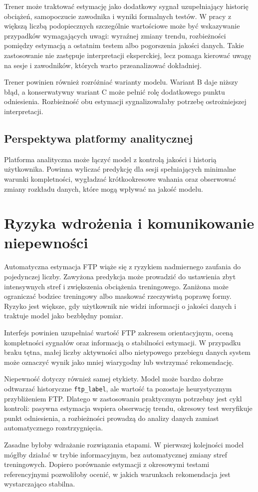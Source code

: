 Trener może traktować estymację jako dodatkowy sygnał uzupełniający historię obciążeń, samopoczucie zawodnika i wyniki formalnych testów. W pracy z większą liczbą podopiecznych szczególnie wartościowe może być wskazywanie przypadków wymagających uwagi: wyraźnej zmiany trendu, rozbieżności pomiędzy estymacją a ostatnim testem albo pogorszenia jakości danych. Takie zastosowanie nie zastępuje interpretacji eksperckiej, lecz pomaga kierować uwagę na sesje i zawodników, których warto przeanalizować dokładniej.

Trener powinien również rozróżniać warianty modelu. Wariant B daje niższy błąd, a konserwatywny wariant C może pełnić rolę dodatkowego punktu odniesienia. Rozbieżność obu estymacji sygnalizowałaby potrzebę ostrożniejszej interpretacji.

\subsection{Perspektywa platformy analitycznej}

Platforma analityczna może łączyć model z kontrolą jakości i historią użytkownika. Powinna wyliczać predykcję dla sesji spełniających minimalne warunki kompletności, wygładzać krótkookresowe wahania oraz obserwować zmiany rozkładu danych, które mogą wpływać na jakość modelu.

\section{Ryzyka wdrożenia i komunikowanie niepewności}

Automatyczna estymacja FTP wiąże się z ryzykiem nadmiernego zaufania do pojedynczej liczby. Zawyżona predykcja może prowadzić do ustawienia zbyt intensywnych stref i zwiększenia obciążenia treningowego. Zaniżona może ograniczać bodziec treningowy albo maskować rzeczywistą poprawę formy. Ryzyko jest większe, gdy użytkownik nie widzi informacji o jakości danych i traktuje model jako bezbłędny pomiar.

Interfejs powinien uzupełniać wartość FTP zakresem orientacyjnym, oceną kompletności sygnałów oraz informacją o stabilności estymacji. W przypadku braku tętna, małej liczby aktywności albo nietypowego przebiegu danych system może oznaczyć wynik jako mniej wiarygodny lub wstrzymać rekomendację.

Niepewność dotyczy również samej etykiety. Model może bardzo dobrze odtwarzać historyczne \texttt{ftp\_label}, ale wartość ta pozostaje heurystycznym przybliżeniem FTP. Dlatego w zastosowaniu praktycznym potrzebny jest cykl kontroli: pasywna estymacja wspiera obserwację trendu, okresowy test weryfikuje punkt odniesienia, a rozbieżności prowadzą do analizy danych zamiast automatycznego rozstrzygnięcia.

Zasadne byłoby wdrażanie rozwiązania etapami. W pierwszej kolejności model mógłby działać w trybie informacyjnym, bez automatycznej zmiany stref treningowych. Dopiero porównanie estymacji z okresowymi testami referencyjnymi pozwoliłoby ocenić, w jakich warunkach rekomendacja jest wystarczająco stabilna.
